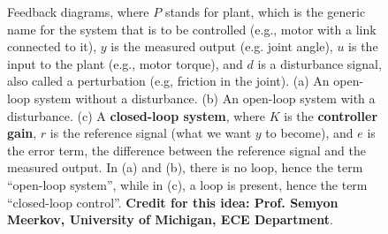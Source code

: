 \begin{figure}[htb]%
\centering
{}%
\hfill
{}%
\hfill
\newline
{}%
\hfill%
    \caption[]{Feedback diagrams, where $P$ stands for plant, which is the generic name for the system that is to be controlled (e.g., motor with a link connected to it), $y$ is the measured output (e.g. joint angle), $u$ is the input to the plant (e.g., motor torque), and $d$ is a disturbance signal, also called a perturbation (e.g, friction in the joint). (a) An open-loop system without a disturbance. (b) An open-loop system with a disturbance. (c) A \textbf{closed-loop system}, where $K$ is the \textbf{controller gain}, $r$ is the reference signal (what we want $y$ to become), and $e$ is the error term, the difference between the reference signal and the measured output. In (a) and (b), there is no loop, hence the term ``open-loop system'', while in (c), a loop is present, hence the term ``closed-loop control''. \textbf{Credit for this idea: Prof. Semyon Meerkov, University of Michigan, ECE Department}. }
    \label{fig:FeedbackDiagramsStatic}
\end{figure}



